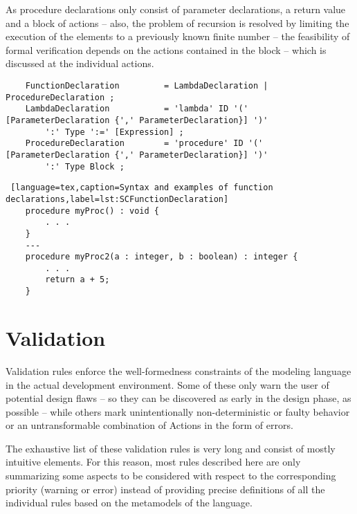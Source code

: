 As procedure declarations only consist of parameter declarations, a return value and a block of actions -- also, the problem of recursion is resolved by limiting the execution of the elements to a previously known finite number -- the feasibility of formal verification depends on the actions contained in the block -- which is discussed at the individual actions.

\bigskip
\begin{lstlisting}
	FunctionDeclaration 		= LambdaDeclaration | ProcedureDeclaration ;
	LambdaDeclaration 			= 'lambda' ID '(' [ParameterDeclaration {',' ParameterDeclaration}] ')' 
		':' Type ':=' [Expression] ;
	ProcedureDeclaration		= 'procedure' ID '(' [ParameterDeclaration {',' ParameterDeclaration}] ')' 
		':' Type Block ;
\end{lstlisting}
\begin{lstlisting} [language=tex,caption=Syntax and examples of function declarations,label=lst:SCFunctionDeclaration]
	procedure myProc() : void {
		. . .
	}
	---
	procedure myProc2(a : integer, b : boolean) : integer {
		. . .
		return a + 5;
	}
\end{lstlisting}

\section{Validation} \label{section_tr_validation}
Validation rules enforce the well-formedness constraints of the modeling language in the actual development environment. Some of these only warn the user of potential design flaws -- so they can be discovered as early in the design phase, as possible -- while others mark unintentionally non-deterministic or faulty behavior or an untransformable combination of Actions in the form of errors.

The exhaustive list of these validation rules is very long and consist of mostly intuitive elements. For this reason, most rules described here are only summarizing some aspects to be considered with respect to the corresponding priority (warning or error) instead of providing precise definitions of all the individual rules based on the metamodels of the language.
 
